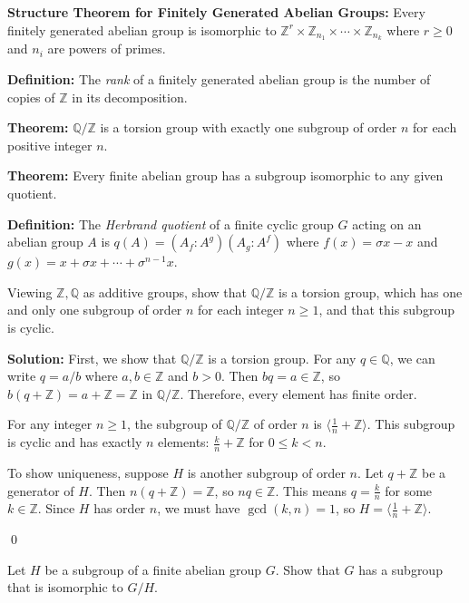 \textbf{Structure Theorem for Finitely Generated Abelian Groups:} Every finitely generated abelian group is isomorphic to $\mathbb{Z}^r \times \mathbb{Z}_{n_1} \times \cdots \times \mathbb{Z}_{n_k}$ where $r \geq 0$ and $n_i$ are powers of primes.

\textbf{Definition:} The \textit{rank} of a finitely generated abelian group is the number of copies of $\mathbb{Z}$ in its decomposition.

\textbf{Theorem:} $\mathbb{Q}/\mathbb{Z}$ is a torsion group with exactly one subgroup of order $n$ for each positive integer $n$.

\textbf{Theorem:} Every finite abelian group has a subgroup isomorphic to any given quotient.

\textbf{Definition:} The \textit{Herbrand quotient} of a finite cyclic group $G$ acting on an abelian group $A$ is $q(A) = (A_f : A^g)(A_g : A^f)$ where $f(x) = \sigma x - x$ and $g(x) = x + \sigma x + \cdots + \sigma^{n-1}x$.

\begin{problembox}
Viewing $\mathbb{Z}, \mathbb{Q}$ as additive groups, show that $\mathbb{Q}/\mathbb{Z}$ is a torsion group, which has one and only one subgroup of order $n$ for each integer $n \geq 1$, and that this subgroup is cyclic.
\end{problembox}

\noindent\textbf{Solution:} First, we show that $\mathbb{Q}/\mathbb{Z}$ is a torsion group. For any $q \in \mathbb{Q}$, we can write $q = a/b$ where $a, b \in \mathbb{Z}$ and $b > 0$. Then $bq = a \in \mathbb{Z}$, so $b(q + \mathbb{Z}) = a + \mathbb{Z} = \mathbb{Z}$ in $\mathbb{Q}/\mathbb{Z}$. Therefore, every element has finite order.

For any integer $n \geq 1$, the subgroup of $\mathbb{Q}/\mathbb{Z}$ of order $n$ is $\langle \frac{1}{n} + \mathbb{Z} \rangle$. This subgroup is cyclic and has exactly $n$ elements: $\frac{k}{n} + \mathbb{Z}$ for $0 \leq k < n$.

To show uniqueness, suppose $H$ is another subgroup of order $n$. Let $q + \mathbb{Z}$ be a generator of $H$. Then $n(q + \mathbb{Z}) = \mathbb{Z}$, so $nq \in \mathbb{Z}$. This means $q = \frac{k}{n}$ for some $k \in \mathbb{Z}$. Since $H$ has order $n$, we must have $\gcd(k, n) = 1$, so $H = \langle \frac{1}{n} + \mathbb{Z} \rangle$.


\qed
\begin{problembox}
Let $H$ be a subgroup of a finite abelian group $G$. Show that $G$ has a subgroup that is isomorphic to $G/H$.
\end{problembox}

